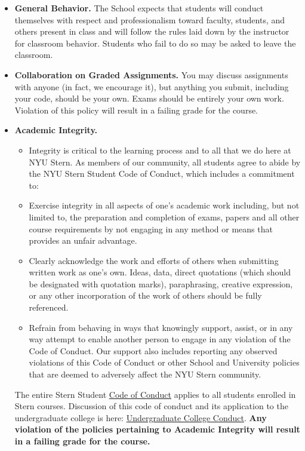 \begin{itemize}
\item \textbf{General Behavior.} The School expects that students will conduct themselves with respect and professionalism toward faculty, students, and others present in class and will follow the rules laid down by the instructor for classroom behavior.  Students who fail to do so may be asked to leave the classroom.

\item \textbf{Collaboration on Graded Assignments.} You may discuss assignments with anyone (in fact, we encourage it), but anything you submit, including your code, should be your own. Exams should be entirely your own work. Violation of this policy will result in a failing grade for the course.

\item \textbf{Academic Integrity.}
\begin{itemize}
\item Integrity is critical to the learning process and to all that we do here at NYU Stern. As members of our community, all students agree to abide by the NYU Stern Student Code of Conduct, which includes a commitment to:
\item Exercise integrity in all aspects of one's academic work including, but not limited to, the preparation and completion of exams, papers and all other course requirements by not engaging in any method or means that provides an unfair advantage.
\item Clearly acknowledge the work and efforts of others when submitting written work as one's own. Ideas, data, direct quotations (which should be designated with quotation marks), paraphrasing, creative expression, or any other incorporation of the work of others should be fully referenced.
\item Refrain from behaving in ways that knowingly support, assist, or in any way attempt to enable another person to engage in any violation of the Code of Conduct. Our support also includes reporting any observed violations of this Code of Conduct or other School and University policies that are deemed to adversely affect the NYU Stern community.
\end{itemize}
The entire Stern Student \href{http://www.stern.nyu.edu/sites/default/files/assets/documents/con_039512.pdf}{Code of Conduct} applies to all students enrolled in Stern courses. Discussion of this code of conduct and its application to the undergraduate college is here: \href{http://www.stern.nyu.edu/uc/codeofconduct}{Undergraduate College Conduct}. \textbf{Any violation of the policies pertaining to Academic Integrity will result in a failing grade for the course.}
\end{itemize}

